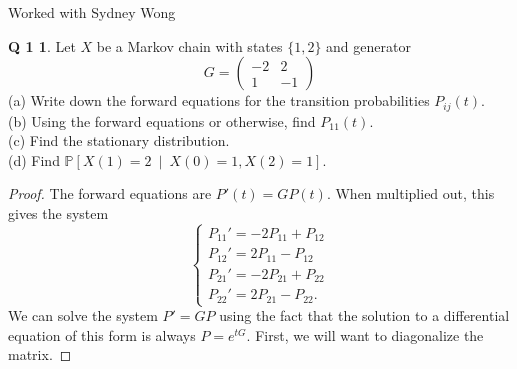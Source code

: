 \documentclass[12pt]{article}
\newcommand{\p}{\mathbb{P}}
\newcommand{\given}{\ \mid \ }
\theoremstyle{definition}
\newtheorem*{prob1}{Q 1}
\begin{document}
\noindent Worked with Sydney Wong
\begin{prob1}
Let $X$ be a Markov chain with states $\{1,2\}$ and generator
$$
G = \begin{pmatrix}
-2 & 2 \\
1 & -1
\end{pmatrix}
$$
(a) Write down the forward equations for the transition probabilities $P_{ij}(t)$.\\
(b) Using the forward equations or otherwise, find $P_{11}(t)$.\\
(c) Find the stationary distribution.\\
(d) Find $\p[X(1) = 2 \given X(0) = 1, X(2) = 1]$.
\end{prob1}

\begin{proof}
The forward equations are $P'(t) = GP(t)$.  When multiplied out, this gives the system
$$
\begin{cases}
P_{11}' = -2P_{11} + P_{12} \\
P_{12}' =  2P_{11} - P_{12} \\
P_{21}' = -2P_{21} + P_{22} \\
P_{22}' =  2P_{21} - P_{22}.
\end{cases}
$$
We can solve the system $P' = GP$ using the fact that the solution to a differential equation of this form is always $P = e^{tG}$.  First, we will want to diagonalize the matrix.


\end{proof}
\end{document}
